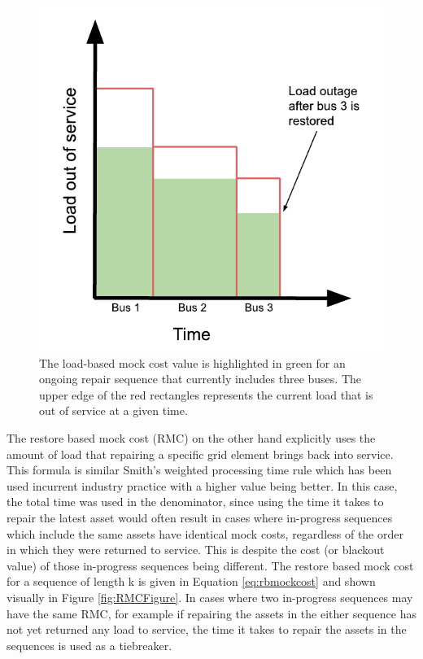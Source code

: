 \documentclass[12pt]{article}
\begin{document}
\begin{figure}[ht]
    \centering %
    \includegraphics[scale=0.8]{LMCFigure.pdf}
    \caption[Load based mock cost formula visualized]{The load-based mock cost value is highlighted in green for an ongoing repair sequence that currently includes three buses. The upper edge of the red rectangles represents the current load that is out of service at a given time.}
    \label{fig:LMCFigure}
\end{figure}
The restore based mock cost (RMC) on the other hand explicitly uses the amount of load that repairing a specific grid element brings back into service. This formula is similar Smith’s weighted processing time rule \cite{smith} which has been used incurrent industry practice \cite{tan} with a higher value being better. In this case, the total time was used in the denominator, since using the time it takes to repair the latest asset would often result in cases where in-progress sequences which include the same assets have identical mock costs, regardless of the order in which they were returned to service. This is despite the cost (or blackout value) of those in-progress sequences being different. The restore based mock cost for a sequence of length k is given in Equation \eqref{eq:rbmockcost} and shown visually in Figure \ref{fig:RMCFigure}. In cases where two in-progress sequences may have the same RMC, for example if repairing the assets in the either sequence has not yet returned any load to service, the time it takes to repair the assets in the sequences is used as a tiebreaker.\par
\end{document}
